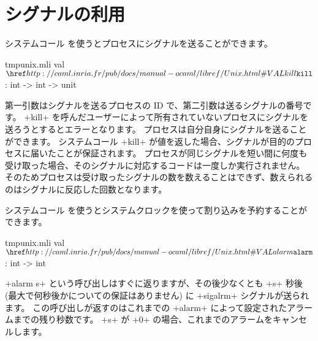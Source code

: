\section{\label{sec/usingsignals}シグナルの利用}

システムコール  を使うとプロセスにシグナルを送ることができます。
%
\begin{listingcodefile}{tmpunix.mli}
val $\libvalue{Unix}{kill}$ : int -> int -> unit
\end{listingcodefile}
%
第一引数はシグナルを送るプロセスの ID で、第二引数は送るシグナルの番号です。
\ml+kill+ を呼んだユーザーによって所有されていないプロセスにシグナルを送ろうとするとエラーとなります。
プロセスは自分自身にシグナルを送ることができます。
システムコール \ml+kill+ が値を返した場合、シグナルが目的のプロセスに届いたことが保証されます。
プロセスが同じシグナルを短い間に何度も受け取った場合、そのシグナルに対応するコードは一度しか実行されません。
そのためプロセスは受け取ったシグナルの数を数えることはできず、数えられるのはシグナルに反応した回数となります。

システムコール  を使うとシステムクロックを使って割り込みを予約することができます。
%
\begin{listingcodefile}{tmpunix.mli}
val $\libvalue{Unix}{alarm}$ : int -> int
\end{listingcodefile}
%
\ml+alarm s+ という呼び出しはすぐに返りますが、その後少なくとも \ml+s+ 秒後
(最大で何秒後かについての保証はありません) に \ml+sigalrm+ シグナルが送られます。
この呼び出しが返すのはこれまでの \ml+alarm+ によって設定されたアラームまでの残り秒数です。
\ml+s+ が \ml+0+ の場合、これまでのアラームをキャンセルします。

